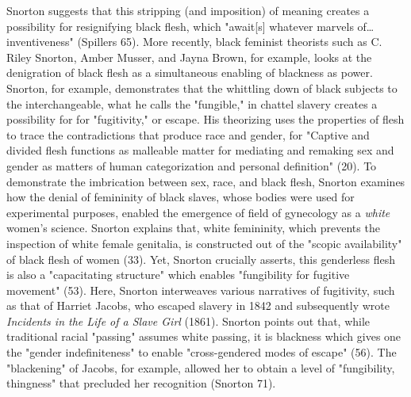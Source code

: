 \documentclass[11pt]{article}
\begin{document}
Snorton suggests that this stripping (and imposition) of meaning
creates a possibility for resignifying black flesh, which "await[s]
whatever marvels of\ldots{} inventiveness" (Spillers 65). More recently,
black feminist theorists such as C. Riley Snorton, Amber Musser, and
Jayna Brown, for example, looks at the denigration of black flesh as a
simultaneous enabling of blackness as power. Snorton, for example,
demonstrates that the whittling down of black subjects to the
interchangeable, what he calls the "fungible," in chattel slavery
creates a possibility for for "fugitivity," or escape. His theorizing
uses the properties of flesh to trace the contradictions that produce
race and gender, for "Captive and divided flesh functions as malleable
matter for mediating and remaking sex and gender as matters of human
categorization and personal definition" (20). To demonstrate the
imbrication between sex, race, and black flesh, Snorton examines how
the denial of femininity of black slaves, whose bodies were used for
experimental purposes, enabled the emergence of field of gynecology as
a \emph{white} women's science. Snorton explains that, white femininity,
which prevents the inspection of white female genitalia, is
constructed out of the "scopic availability" of black flesh of women
(33). Yet, Snorton crucially asserts, this genderless flesh is also a
"capacitating structure" which enables "fungibility for fugitive
movement" (53). Here, Snorton interweaves various narratives of
fugitivity, such as that of Harriet Jacobs, who escaped slavery in
1842 and subsequently wrote \emph{Incidents in the Life of a Slave Girl}
(1861). Snorton points out that, while traditional racial "passing"
assumes white passing, it is blackness which gives one the "gender
indefiniteness" to enable "cross-gendered modes of escape" (56). The
"blackening" of Jacobs, for example, allowed her to obtain a level of
"fungibility, thingness" that precluded her recognition (Snorton 71).
\end{document}
